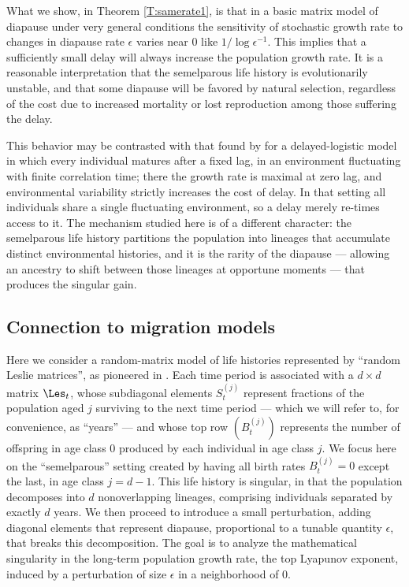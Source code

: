 \documentclass[11pt]{amsart}
\begin{document}
What we show, in Theorem \ref{T:samerate1}, is that in a basic matrix model of diapause under very general conditions
the sensitivity of stochastic growth rate to changes in
diapause rate $\epsilon$ varies near 0 like $1/\log \epsilon^{-1}$. 
This implies that a sufficiently small delay will always
increase the population growth rate. 
It is a reasonable interpretation that the semelparous life history is evolutionarily unstable, and that
some diapause will be favored by natural selection, regardless of the cost due to
increased mortality or lost reproduction among those
suffering the delay.

This behavior may be contrasted with that found by \cite{HFRM26} for a delayed-logistic model in which every individual matures after a fixed lag, in an environment fluctuating with finite correlation time; there the growth rate is maximal at zero lag, and environmental variability strictly increases the cost of delay. In that setting all individuals share a single fluctuating environment, so a delay merely re-times access to it. 
The mechanism studied here is of a different character: the semelparous life history partitions the population into lineages that accumulate distinct environmental histories, and it is the rarity of the diapause --- allowing an ancestry to shift between those lineages at opportune moments --- that produces the singular gain.

\subsection{Connection to migration models}
Here we consider a random-matrix model of life histories represented by ``random Leslie matrices'', as pioneered in \cite{sT90}.
Each time period is associated with a $d\times d$ matrix $\Les_t$, whose subdiagonal elements $S_t^{(j)}$ represent fractions of the population aged $j$ surviving to the next time period --- which we will refer to, for convenience, as ``years'' --- and whose top row $(B_t^{(j)})$ represents the number of offspring in age class 0 produced by each individual in age class $j$.
We focus here on the ``semelparous'' setting created by having all birth rates $B_t^{(j)}=0$ except the last, in age class $j=d-1$.
This life history is singular, in that the population decomposes into $d$ nonoverlapping lineages, comprising individuals separated by exactly $d$ years.
We then proceed to introduce a small perturbation, adding diagonal elements that represent diapause, proportional to a tunable quantity $\epsilon$, that breaks this decomposition.
The goal is to analyze the mathematical singularity in the long-term population growth rate, the top Lyapunov exponent, induced by a perturbation of size $\epsilon$ in a neighborhood of 0.
\end{document}
